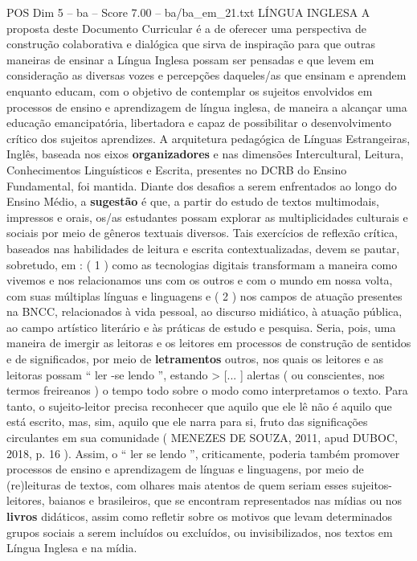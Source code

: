 \begin{textsample}{POS Dim 5 – ba – Score 7.00 – ba/ba\_em\_21.txt}  \label{ex:f5_pos_271}
LÍNGUA INGLESA A proposta deste Documento Curricular é a de oferecer uma perspectiva de construção colaborativa e dialógica que sirva de inspiração para que outras maneiras de ensinar a Língua Inglesa possam ser pensadas e que levem em consideração as diversas vozes e percepções daqueles/as que ensinam e aprendem enquanto educam, com o objetivo de contemplar os sujeitos envolvidos em processos de ensino e aprendizagem de língua inglesa, de maneira a alcançar uma educação emancipatória, libertadora e capaz de possibilitar o desenvolvimento crítico dos sujeitos aprendizes.
A arquitetura pedagógica de Línguas Estrangeiras, Inglês, baseada nos eixos \textbf{organizadores} e nas dimensões Intercultural, Leitura, Conhecimentos Linguísticos e Escrita, presentes no DCRB do Ensino Fundamental, foi mantida.
Diante dos desafios a serem enfrentados ao longo do Ensino Médio, a \textbf{sugestão} é que, a partir do estudo de textos multimodais, impressos e orais, os/as estudantes possam explorar as multiplicidades culturais e sociais por meio de gêneros textuais diversos.
Tais exercícios de reflexão crítica, baseados nas habilidades de leitura e escrita contextualizadas, devem se pautar, sobretudo, em : ( 1 ) como as tecnologias digitais transformam a maneira como vivemos e nos relacionamos uns com os outros e com o mundo em nossa volta, com suas múltiplas línguas e linguagens e ( 2 ) nos campos de atuação presentes na BNCC, relacionados à vida pessoal, ao discurso midiático, à atuação pública, ao campo artístico literário e às práticas de estudo e pesquisa.
Seria, pois, uma maneira de imergir as leitoras e os leitores em processos de construção de sentidos e de significados, por meio de \textbf{letramentos} outros, nos quais os leitores e as leitoras possam “ ler -se lendo ”, estando > [... ] alertas ( ou conscientes, nos termos freireanos ) o tempo todo sobre o modo como interpretamos o texto.
Para tanto, o sujeito-leitor precisa reconhecer que aquilo que ele lê não é aquilo que está escrito, mas, sim, aquilo que ele narra para si, fruto das significações circulantes em sua comunidade ( MENEZES DE SOUZA, 2011, apud DUBOC, 2018, p. 16 ).
Assim, o “ ler se lendo ”, criticamente, poderia também promover processos de ensino e aprendizagem de línguas e linguagens, por meio de (re)leituras de textos, com olhares mais atentos de quem seriam esses sujeitos-leitores, baianos e brasileiros, que se encontram representados nas mídias ou nos \textbf{livros} didáticos, assim como refletir sobre os motivos que levam determinados grupos sociais a serem incluídos ou excluídos, ou invisibilizados, nos textos em Língua Inglesa e na mídia.

\end{textsample}
